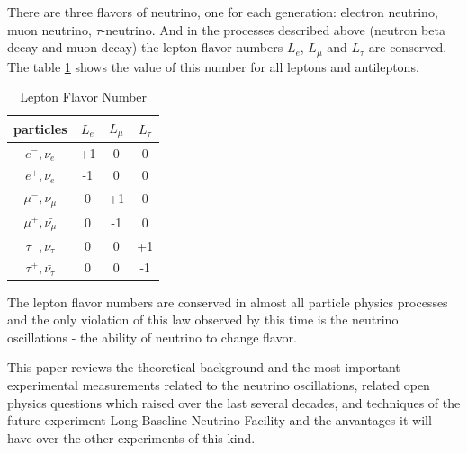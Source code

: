 There are three flavors of neutrino, one for each generation: electron neutrino, muon neutrino, $\tau$-neutrino. And in the processes described above (neutron beta decay and muon decay) the lepton flavor numbers $L_e$, $L_{\mu}$ and $L_{\tau}$ are conserved. The table \ref{tab:LeptonFlavorNumber} shows the value of this number for all leptons and antileptons. 

\begin{table}[h]
  \begin{center}
  \caption{ Lepton Flavor Number}
  \begin{tabular}{|c|c|c|c|}
     particles & $L_e$ & $L_{\mu}$ & $L_{\tau}$ \\ \hline
     $e^-,\nu_e$ &  +1  &  0  &  0  \\ \hline 
     $e^+, \bar{\nu_e}$ &  -1  &  0  &  0  \\ \hline 
     $\mu^-,\nu_{\mu}$ &  0  &  +1  &  0  \\ \hline 
     $\mu^+, \bar{\nu_{\mu}}$ &  0  &  -1  &  0  \\ \hline 
     $\tau^-,\nu_{\tau}$ &  0  &  0  &  +1  \\ \hline 
     $\tau^+, \bar{\nu_{\tau}}$ &  0  &  0  &  -1  \\ \hline 
  \end{tabular}
  \label{tab:LeptonFlavorNumber}
  \end{center}
\end{table}

The lepton flavor numbers are conserved in almost all particle physics processes and the only violation of this law observed by this time is the neutrino oscillations - the ability of neutrino to change flavor. 

This paper reviews the theoretical background and the most important experimental measurements related to the neutrino oscillations, related open physics questions which raised over the last several decades, and techniques of the future experiment Long Baseline Neutrino Facility and the anvantages it will have over the other experiments of this kind.  


